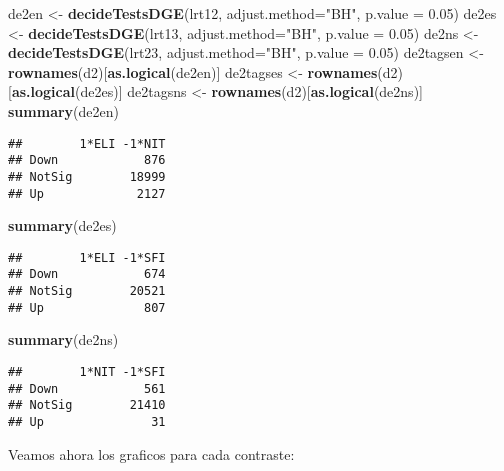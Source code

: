 \documentclass[
]{article}
\newenvironment{Shaded}{\begin{snugshade}}{\end{snugshade}}
\newcommand{\DataTypeTok}[1]{\textcolor[rgb]{0.13,0.29,0.53}{#1}}
\newcommand{\FloatTok}[1]{\textcolor[rgb]{0.00,0.00,0.81}{#1}}
\newcommand{\KeywordTok}[1]{\textcolor[rgb]{0.13,0.29,0.53}{\textbf{#1}}}
\newcommand{\NormalTok}[1]{#1}
\newcommand{\StringTok}[1]{\textcolor[rgb]{0.31,0.60,0.02}{#1}}
\begin{document}
\begin{Shaded}
\begin{Highlighting}[]
\NormalTok{de2en <-}\StringTok{ }\KeywordTok{decideTestsDGE}\NormalTok{(lrt12, }\DataTypeTok{adjust.method=}\StringTok{"BH"}\NormalTok{, }\DataTypeTok{p.value =} \FloatTok{0.05}\NormalTok{)}
\NormalTok{de2es <-}\StringTok{ }\KeywordTok{decideTestsDGE}\NormalTok{(lrt13, }\DataTypeTok{adjust.method=}\StringTok{"BH"}\NormalTok{, }\DataTypeTok{p.value =} \FloatTok{0.05}\NormalTok{)}
\NormalTok{de2ns <-}\StringTok{ }\KeywordTok{decideTestsDGE}\NormalTok{(lrt23, }\DataTypeTok{adjust.method=}\StringTok{"BH"}\NormalTok{, }\DataTypeTok{p.value =} \FloatTok{0.05}\NormalTok{)}
\NormalTok{de2tagsen <-}\StringTok{ }\KeywordTok{rownames}\NormalTok{(d2)[}\KeywordTok{as.logical}\NormalTok{(de2en)]}
\NormalTok{de2tagses <-}\StringTok{ }\KeywordTok{rownames}\NormalTok{(d2)[}\KeywordTok{as.logical}\NormalTok{(de2es)]}
\NormalTok{de2tagsns <-}\StringTok{ }\KeywordTok{rownames}\NormalTok{(d2)[}\KeywordTok{as.logical}\NormalTok{(de2ns)]}
\KeywordTok{summary}\NormalTok{(de2en)}
\end{Highlighting}
\end{Shaded}

\begin{verbatim}
##        1*ELI -1*NIT
## Down            876
## NotSig        18999
## Up             2127
\end{verbatim}

\begin{Shaded}
\begin{Highlighting}[]
\KeywordTok{summary}\NormalTok{(de2es)}
\end{Highlighting}
\end{Shaded}

\begin{verbatim}
##        1*ELI -1*SFI
## Down            674
## NotSig        20521
## Up              807
\end{verbatim}

\begin{Shaded}
\begin{Highlighting}[]
\KeywordTok{summary}\NormalTok{(de2ns)}
\end{Highlighting}
\end{Shaded}

\begin{verbatim}
##        1*NIT -1*SFI
## Down            561
## NotSig        21410
## Up               31
\end{verbatim}

Veamos ahora los graficos para cada contraste:
\end{document}
